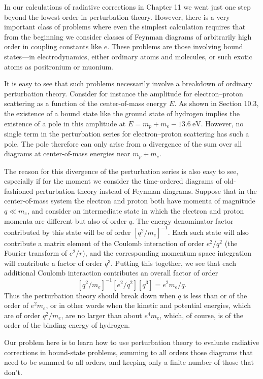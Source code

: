 
In our calculations of radiative corrections in Chapter 11 we went just one
step beyond the lowest order in perturbation theory. However, there is a very
important class of problems where even the simplest calculation requires that
from the beginning we consider classes of Feynman diagrams of arbitrarily high
order in coupling constants like $e$. These problems are those involving bound
states---in electrodynamics, either ordinary atoms and molecules, or such exotic
atoms as positronium or muonium.

It is easy to see that such problems necessarily involve a breakdown of
ordinary perturbation theory. Consider for instance the amplitude for
electron--proton scattering as a function of the center-of-mass energy $E$.
As shown in Section 10.3, the existence of a bound state like the ground state
of hydrogen implies the existence of a pole in this amplitude at
$E=m_p+m_e-13.6~\mathrm{eV}$. However, no single term in the perturbation series
for electron--proton scattering has such a pole. The pole therefore can only
arise from a divergence of the sum over all diagrams at center-of-mass energies
near $m_p+m_e$.

The reason for this divergence of the perturbation series is also easy to see,
especially if for the moment we consider the time-ordered diagrams of
old-fashioned perturbation theory instead of Feynman diagrams. Suppose that in
the center-of-mass system the electron and proton both have momenta of magnitude
$q\ll m_e$, and consider an intermediate state in which the electron and proton
momenta are different but also of order $q$. The energy denominator factor
contributed by this state will be of order $[q^2/m_e]^{-1}$. Each such state
will also contribute a matrix element of the Coulomb interaction of order
$e^2/q^2$ (the Fourier transform of $e^2/r$), and the corresponding momentum
space integration will contribute a factor of order $q^3$. Putting this
together, we see that each additional Coulomb interaction contributes an
overall factor of order
\[
  [q^2/m_e]^{-1}[e^2/q^2][q^3]=e^2m_e/q.
\]
Thus the perturbation theory should break down when $q$ is less than or of the
order of $e^2m_e$, or in other words when the kinetic and potential energies,
which are of order $q^2/m_e$, are no larger than about $e^4m_e$, which, of
course, is of the order of the binding energy of hydrogen.

Our problem here is to learn how to use perturbation theory to evaluate
radiative corrections in bound-state problems, summing to all orders those
diagrams that need to be summed to all orders, and keeping only a finite number
of those that don't.
